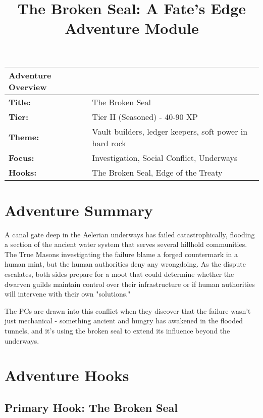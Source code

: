 \documentclass[11pt]{article}
\title{\textbf{The Broken Seal: A Fate's Edge Adventure Module}}
\author{}
\date{}
\begin{document}
\maketitle

\begin{center}
\begin{tabular}{|p{2.5cm}|p{12cm}|}
\hline
\textbf{Adventure Overview} & \\
\hline
\textbf{Title:} & The Broken Seal \\
\textbf{Tier:} & Tier II (Seasoned) - 40-90 XP \\
\textbf{Theme:} & Vault builders, ledger keepers, soft power in hard rock \\
\textbf{Focus:} & Investigation, Social Conflict, Underways \\
\textbf{Hooks:} & The Broken Seal, Edge of the Treaty \\
\hline
\end{tabular}
\end{center}

\section{Adventure Summary}

A canal gate deep in the Aelerian underways has failed catastrophically, flooding a section of the ancient water system that serves several hillhold communities. The True Masons investigating the failure blame a forged countermark in a human mint, but the human authorities deny any wrongdoing. As the dispute escalates, both sides prepare for a moot that could determine whether the dwarven guilds maintain control over their infrastructure or if human authorities will intervene with their own "solutions."

The PCs are drawn into this conflict when they discover that the failure wasn't just mechanical - something ancient and hungry has awakened in the flooded tunnels, and it's using the broken seal to extend its influence beyond the underways.

\section{Adventure Hooks}

\subsection{Primary Hook: The Broken Seal}
\end{document}
